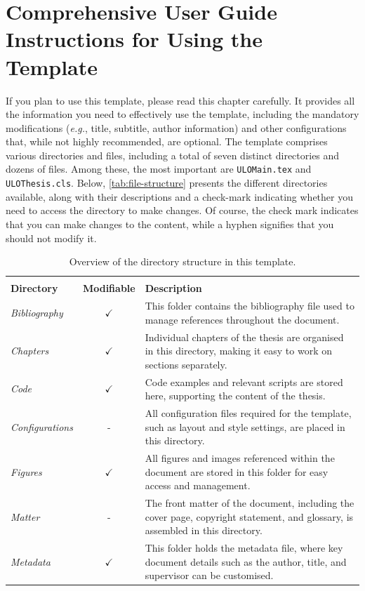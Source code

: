 \chapter[Comprehensive User Guide: Instructions for Using the Template]{Comprehensive User Guide Instructions for Using the Template}
\label{cp:user-guide}

If you plan to use this template, please read this chapter carefully. It provides all the information you need to effectively use the template, including the mandatory modifications (\textit{e.g.}, title, subtitle, author information) and other configurations that, while not highly recommended, are optional. The template comprises various directories and files, including a total of seven distinct directories and dozens of files. Among these, the most important are \texttt{ULOMain.tex} and \texttt{ULOThesis.cls}. Below, \autoref{tab:file-structure} presents the different directories available, along with their descriptions and a check-mark indicating whether you need to access the directory to make changes. Of course, the check mark indicates that you can make changes to the content, while a hyphen signifies that you should not modify it.

\begin{table}[!htpb]
    \setlength{\extrarowheight}{2pt}
    \caption[Directory structure and file organisation]{Overview of the directory structure in this template.}
    \label{tab:file-structure}
    \begin{tabularx}{\textwidth}{lcX}
        \toprule
        \\[-1.5\normalbaselineskip]
        \textbf{Directory} & \textbf{Modifiable} & \textbf{Description} \\ [0em]
        \midrule
        \textit{Bibliography} & $\checkmark$ & This folder contains the bibliography file used to manage references throughout the document. \\
        \textit{Chapters} & $\checkmark$ & Individual chapters of the thesis are organised in this directory, making it easy to work on sections separately. \\
        \textit{Code} & $\checkmark$ & Code examples and relevant scripts are stored here, supporting the content of the thesis. \\
        \textit{Configurations} & - & All configuration files required for the template, such as layout and style settings, are placed in this directory. \\
        \textit{Figures} & $\checkmark$ & All figures and images referenced within the document are stored in this folder for easy access and management. \\
        \textit{Matter} & - & The front matter of the document, including the cover page, copyright statement, and glossary, is assembled in this directory. \\
        \textit{Metadata} & $\checkmark$ & This folder holds the metadata file, where key document details such as the author, title, and supervisor can be customised. \\
        \bottomrule
    \end{tabularx}
\end{table}


